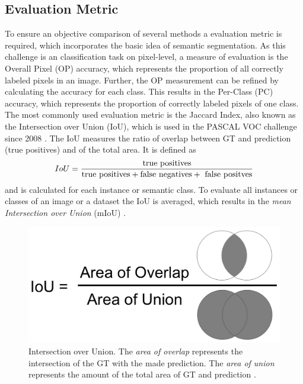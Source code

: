 \subsection{Evaluation Metric}\label{ord:ch2:sec2:subsec2}
To ensure an objective comparison of several methods a evaluation metric is required, which incorporates the basic idea of semantic segmentation.
As this challenge is an classification task on pixel-level, a measure of evaluation is the Overall Pixel (OP) accuracy, which represents the proportion of all correctly labeled pixels in an image.
Further, the OP measurement can be refined by calculating the accuracy for each class.
This results in the Per-Class (PC) accuracy, which represents the proportion of correctly labeled pixels of one class.
The most commonly used evaluation metric is the Jaccard Index, also known as the Intersection over Union (IoU), which is used in the PASCAL VOC challenge \cite{Eve20-PascalVOC} since 2008 \cite{Csu13-EvalMetric}. 
The IoU measures the ratio of overlap between GT and prediction (true positives) and of the total area. 
It is defined as
\begin{equation} \label{equ:iou}
	\centering
	IoU = \frac{\textnormal{true positives}}{\textnormal{true positives} + \textnormal{false negatives} + \textnormal{ false positves}}
\end{equation}
and is calculated for each instance or semantic class.
To evaluate all instances or classes of an image or a dataset the IoU is averaged, which results in the \textit{mean Intersection over Union} (mIoU) \cite{TF21-MeanIoU} \cite{Fer19-SemSeg}.

\begin{figure}
	\includegraphics[scale=0.5]{figures/chap222_iou.png}
	\caption{Intersection over Union. The \textit{area of overlap} represents the intersection of the GT with the made prediction. The \textit{area of union} represents the amount of the total area of GT and prediction \cite{Sha18-DLCV}.}
	\label{fig:ch2:sec2:iou}
\end{figure}

